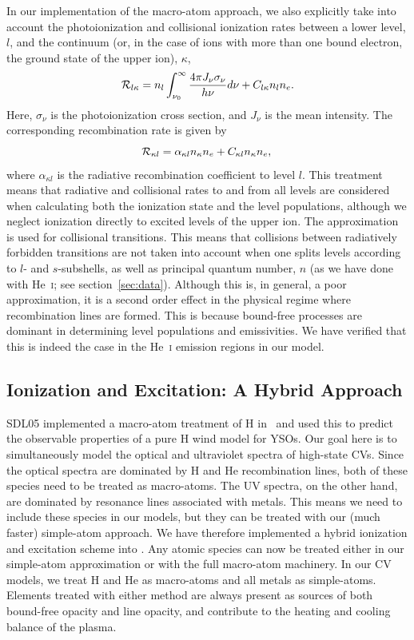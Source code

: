 \documentclass[preprint, a4paper, 11pt]{aastex}
\begin{document}
In our implementation of the macro-atom approach, we also explicitly
take into account the photoionization and collisional ionization rates
between a lower level, $l$, and the continuum (or, in the case of ions
with more than one bound electron, the ground state of the upper ion),
$\kappa$,
\begin{equation}
{\cal R}_{l \kappa}= n_l \int_{\nu_0}^{\infty} \frac{ 4 \pi J_{\nu}
  \sigma_{\nu}}{h \nu} d\nu + C_{l \kappa} n_l n_e.
\end{equation}
Here, $\sigma_{\nu}$ is the photoionization cross section, and $J_{\nu}$
is the mean intensity. The corresponding recombination rate is given
by 
\begin{equation}
{\cal R}_{\kappa l} = \alpha_{\kappa l} n_{\kappa} n_e + C_{\kappa l}
n_\kappa n_e, \\
\end{equation}
where $\alpha_{\kappa l}$ is the radiative recombination coefficient
to level $l$. This treatment means that radiative and collisional
rates to and from all levels are considered when calculating both the
ionization state and the level populations, although we neglect 
ionization directly to excited levels of the upper ion. The
\cite{vanregemorter} approximation is used for collisional
transitions. This means that collisions between radiatively
forbidden transitions are not taken into account when one 
splits levels according to $l$- and $s$-subshells, as well
as principal quantum number, $n$ (as we have done with He~\textsc{i}; 
see section~\ref{sec:data}). Although this is, in general, 
a poor approximation, it is a second order effect in the physical 
regime where recombination lines are formed. This is because bound-free processes are 
dominant in determining level populations and emissivities.
We have verified that this is indeed the case in the He~\textsc{i}
emission regions in our model.

\subsection{Ionization and Excitation: A Hybrid Approach}

SDL05 implemented a macro-atom treatment of H in \py\ and used
this to predict the observable properties of a pure H wind
model for YSOs. Our goal here is to simultaneously model the optical
and ultraviolet spectra of high-state CVs. Since the optical spectra
are dominated by H and He recombination lines, both of these species
need to be treated as macro-atoms. The UV spectra, on the other hand,
are dominated by resonance lines associated with metals. This means we
need to include these species in our models, but they can be treated 
with our (much faster) simple-atom approach. We have therefore
implemented a hybrid ionization and excitation scheme into \py. Any
atomic species can now be treated either in our simple-atom
approximation or with the full macro-atom machinery. In our CV
models, we treat H and He as macro-atoms and all metals as
simple-atoms. Elements treated with either method
are always present as sources of both bound-free opacity and line opacity, 
and contribute to the heating and cooling balance of the plasma.
\end{document}
